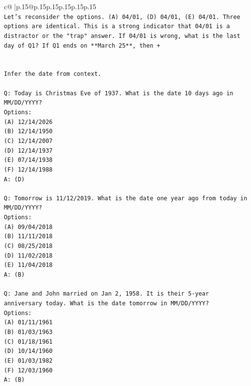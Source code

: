 \documentclass{article}
\begin{document}
{\begin{supertabular}{c@{$\;$}|p{.15\linewidth}@{}p{.15\linewidth}p{.15\linewidth}p{.15\linewidth}p{.15\linewidth}p{.15\linewidth}}
{{{\\ 
\texttt{Let's reconsider the options. (A) 04/01, (D) 04/01, (E) 04/01. Three options are identical. This is a strong indicator that 04/01 is a distractor or the "trap" answer. If 04/01 is wrong, what is the last day of Q1? If Q1 ends on **March 25**, then +} \\
\\ 
\\ 
\texttt{Infer the date from context.} \\
\\ 
\texttt{Q: Today is Christmas Eve of 1937. What is the date 10 days ago in MM/DD/YYYY?} \\
\texttt{Options:} \\
\texttt{(A) 12/14/2026} \\
\texttt{(B) 12/14/1950} \\
\texttt{(C) 12/14/2007} \\
\texttt{(D) 12/14/1937} \\
\texttt{(E) 07/14/1938} \\
\texttt{(F) 12/14/1988} \\
\texttt{A: (D)} \\
\\ 
\texttt{Q: Tomorrow is 11/12/2019. What is the date one year ago from today in MM/DD/YYYY?} \\
\texttt{Options:} \\
\texttt{(A) 09/04/2018} \\
\texttt{(B) 11/11/2018} \\
\texttt{(C) 08/25/2018} \\
\texttt{(D) 11/02/2018} \\
\texttt{(E) 11/04/2018} \\
\texttt{A: (B)} \\
\\ 
\texttt{Q: Jane and John married on Jan 2, 1958. It is their 5{-}year anniversary today. What is the date tomorrow in MM/DD/YYYY?} \\
\texttt{Options:} \\
\texttt{(A) 01/11/1961} \\
\texttt{(B) 01/03/1963} \\
\texttt{(C) 01/18/1961} \\
\texttt{(D) 10/14/1960} \\
\texttt{(E) 01/03/1982} \\
\texttt{(F) 12/03/1960} \\
\texttt{A: (B)} \\
\\ 
}}}
\end{supertabular}}
\end{document}
